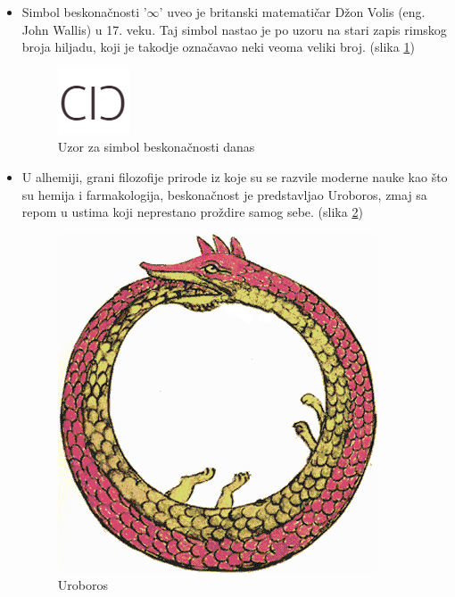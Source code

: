 \documentclass[a4paper]{article}
\begin{document}
\begin{itemize}
    \item Simbol beskonačnosti '$\infty$' uveo je britanski matematičar Džon Volis (eng. John Wallis) u 17. veku. Taj simbol nastao je po uzoru na stari zapis rimskog broja hiljadu, koji je takodje označavao neki veoma veliki broj. (slika \ref{fig:Uzor za simbol beskonačnosti danas})\cite{beskonačno2016}
    
    \begin{figure}[ht!]
    \begin{center}
    \includegraphics[scale=0.75]{Simbol.PNG}
    \end{center}
    \caption{Uzor za simbol beskonačnosti danas}
    \label{fig:Uzor za simbol beskonačnosti danas}
    \end{figure}
    
    \item U alhemiji, grani filozofije prirode iz koje su se razvile moderne nauke kao što su hemija i farmakologija, beskonačnost je predstavljao Uroboros, zmaj sa repom u ustima koji neprestano proždire samog sebe. (slika \ref{fig:Uroboros})
    
    \begin{figure}[ht!]
    \begin{center}
    \includegraphics[scale=0.4]{Uroboros.png}
    \end{center}
    \caption{Uroboros}
    \label{fig:Uroboros}
    \end{figure}
\end{itemize}
\end{document}
